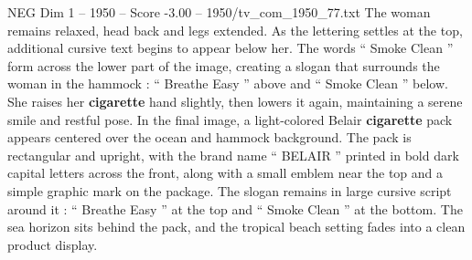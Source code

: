 \begin{textsample}{NEG Dim 1 – 1950 – Score -3.00 – 1950/tv\_com\_1950\_77.txt}
The woman remains relaxed, head back and legs extended.
As the lettering settles at the top, additional cursive text begins to appear below her.
The words “ Smoke Clean ” form across the lower part of the image, creating a slogan that surrounds the woman in the hammock : “ Breathe Easy ” above and “ Smoke Clean ” below.
She raises her \textbf{cigarette} hand slightly, then lowers it again, maintaining a serene smile and restful pose.
In the final image, a light-colored Belair \textbf{cigarette} pack appears centered over the ocean and hammock background.
The pack is rectangular and upright, with the brand name “ BELAIR ” printed in bold dark capital letters across the front, along with a small emblem near the top and a simple graphic mark on the package.
The slogan remains in large cursive script around it : “ Breathe Easy ” at the top and “ Smoke Clean ” at the bottom.
The sea horizon sits behind the pack, and the tropical beach setting fades into a clean product display.

\end{textsample}
